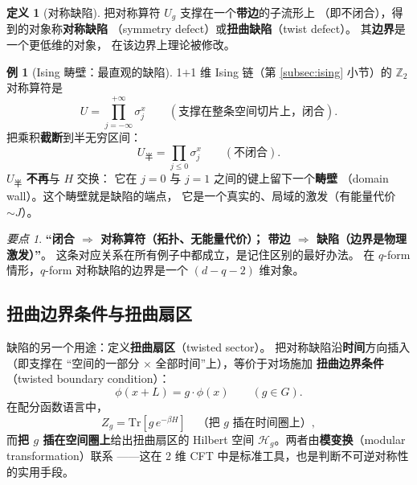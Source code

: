 \documentclass[UTF8,a4paper,11pt]{ctexart}
\theoremstyle{plain}
\theoremstyle{definition}
\newtheorem{definition}{定义}[section]
\newtheorem{example}{例}[section]
\theoremstyle{remark}
\newtheorem{keypoint}{要点}[section]
\newcommand{\Tr}{\mathrm{Tr}}
\newcommand{\ZZ}{\mathbb{Z}}
\newcommand{\Ham}{\mathcal{H}}
\newcommand{\en}[1]{\textsf{#1}}       %
\newcommand{\Uop}{U}
\begin{document}
\begin{definition}[对称缺陷]
把对称算符 $\Uop_g$ 支撑在一个\textbf{带边}的子流形上
（即不闭合），得到的对象称\textbf{对称缺陷}
（\en{symmetry defect}）或\textbf{扭曲缺陷}（\en{twist defect}）。
其\textbf{边界}是一个更低维的对象，
在该边界上理论被修改。
\end{definition}

\begin{example}[Ising 畴壁：最直观的缺陷]
\label{ex:domainwall}
1$+$1 维 Ising 链（第 \ref{subsec:ising} 小节）的 $\ZZ_2$ 对称算符是
\begin{equation}
  \Uop=\prod_{j=-\infty}^{+\infty}\sigma^x_j
  \qquad(\text{支撑在整条空间切片上，闭合}).
\end{equation}
把乘积\textbf{截断}到半无穷区间：
\begin{equation}
  \Uop_{\text{半}}=\prod_{j\le 0}\sigma^x_j
  \qquad(\text{不闭合}) .
\end{equation}
$\Uop_{\text{半}}$ \textbf{不再}与 $H$ 交换：
它在 $j=0$ 与 $j=1$ 之间的键上留下一个\textbf{畴壁}
（\en{domain wall}）。这个畴壁就是缺陷的端点，
它是一个真实的、局域的激发（有能量代价 $\sim J$）。
\end{example}

\begin{keypoint}
\label{kp:defect-vs-operator}
\textbf{“闭合 $\Rightarrow$ 对称算符（拓扑、无能量代价）；
带边 $\Rightarrow$ 缺陷（边界是物理激发）”}。
这条对应关系在所有例子中都成立，是记住区别的最好办法。
在 $q$-form 情形，$q$-form 对称缺陷的边界是一个
$(d-q-2)$ 维对象。
\end{keypoint}

\subsection{扭曲边界条件与扭曲扇区}

缺陷的另一个用途：定义\textbf{扭曲扇区}（\en{twisted sector}）。
把对称缺陷沿\textbf{时间}方向插入（即支撑在
“空间的一部分 $\times$ 全部时间”上），等价于对场施加
\textbf{扭曲边界条件}（\en{twisted boundary condition}）：
\begin{equation}
  \phi(x+L)=g\cdot\phi(x)
  \qquad(g\in G).
  \label{eq:twisted}
\end{equation}
在配分函数语言中，
\begin{equation}
  Z_g=\Tr\!\left[g\,e^{-\beta H}\right]
  \quad\text{（把 }g\text{ 插在时间圈上）},
  \label{eq:Zg}
\end{equation}
而\textbf{把 $g$ 插在空间圈上}给出扭曲扇区的 Hilbert 空间
$\Ham_g$。两者由\textbf{模变换}（\en{modular transformation}）联系
——这在 2 维 CFT 中是标准工具，也是判断不可逆对称性的实用手段。
\end{document}
